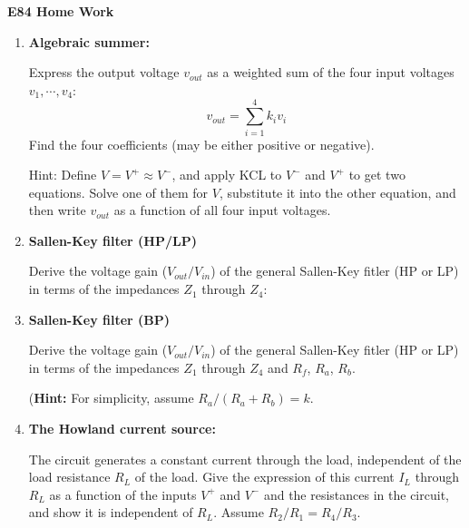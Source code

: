 \usepackage{html}

\begin{center}
{\Large \bf  E84 Home Work}
\end{center}
\begin{enumerate}

\begin{enumerate}

\item {\bf Algebraic summer:}


  Express the output voltage $v_{out}$ as a weighted sum of the four
  input voltages $v_1,\cdots,v_4$:
  \[
  v_{out}=\sum_{i=1}^4 k_i v_i
  \]
  Find the four coefficients (may be either positive or negative).

  Hint: Define $V=V^+ \approx V^- $, and apply KCL to $V^-$ and $V^+$ 
  to get two equations. Solve one of them for $V$, substitute it into 
  the other equation, and then write $v_{out}$ as a function of all 
  four input voltages.


\item {\bf Sallen-Key filter (HP/LP)}

  Derive the voltage gain ($V_{out}/V_{in}$) of the general Sallen-Key 
  fitler (HP or LP) in terms of the impedances $Z_1$ through $Z_4$:


\item {\bf Sallen-Key filter (BP)}


  Derive the voltage gain ($V_{out}/V_{in}$) of the general Sallen-Key 
  fitler (HP or LP) in terms of the impedances $Z_1$ through $Z_4$
  and $R_f$, $R_a$, $R_b$.

  ({\bf Hint:} For simplicity, assume $R_a/(R_a+R_b)=k$.

\item {\bf The Howland current source:}

  The circuit generates a constant current through the load, independent
  of the load resistance $R_L$ of the load. Give the expression of this 
  current $I_L$ through $R_L$ as a function of the inputs $V^+$ and $V^-$ 
  and the resistances in the circuit, and show it is independent of $R_L$.
  Assume $R_2/R_1=R_4/R_3$.
  

\end{enumerate}
\end{enumerate}
